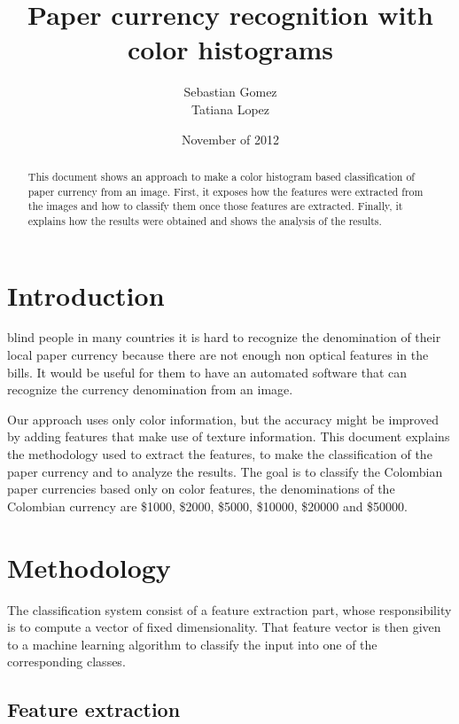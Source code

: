 \documentclass{IEEEtran}
\begin{document}
\title{Paper currency recognition with color histograms}
\date {November of 2012}
\author{Sebastian Gomez \\ Tatiana Lopez}
\maketitle

\begin{abstract}
This document shows an approach to make a color histogram based classification of paper currency from an image.
First, it exposes how the features were extracted from the images and how to classify them once those features
are extracted. Finally, it explains how the results were obtained and shows the analysis of the results.
\end{abstract}

\section{Introduction}
 blind people in many countries it is hard to recognize the denomination of their local paper currency because
there are not enough non optical features in the bills. It would be useful for them to have an automated software that
can recognize the currency denomination from an image.


Our approach uses only color information, but the accuracy might be improved by adding features that make use of
texture information. This document explains the methodology used to extract the features, to make the classification
of the paper currency and to analyze the results. The goal is to classify the Colombian paper currencies based only
on color features, the denominations of the Colombian currency are \$1000, \$2000, \$5000, \$10000, \$20000 and
\$50000.

\section{Methodology}

The classification system consist of a feature extraction part, whose responsibility is to compute a vector of
fixed dimensionality. That feature vector is then given to a machine learning algorithm to classify the input
into one of the corresponding classes.

\subsection{Feature extraction}
\end{document}

